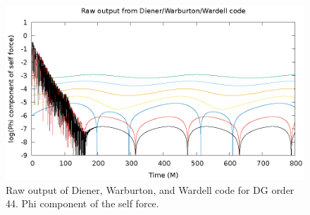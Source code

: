 \begin{figure}
  \includegraphics{rawPhiSelfForceModes}
  \caption{Raw output of Diener, Warburton, and Wardell code for DG order 44. Phi component of the self force.}
  \label{phisf}
\end{figure}

